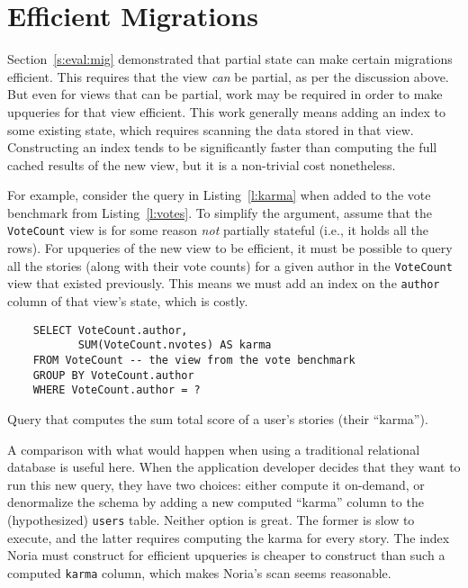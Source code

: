 \section{Efficient Migrations}

Section~\ref{s:eval:mig} demonstrated that partial state can make certain
migrations efficient. This requires that the view \emph{can} be partial, as
per the discussion above. But even for views that can be partial, work may be
required in order to make upqueries for that view efficient. This work generally
means adding an index to some existing state, which requires scanning the data
stored in that view. Constructing an index tends to be significantly faster than
computing the full cached results of the new view, but it is a non-trivial cost
nonetheless.

For example, consider the query in Listing~\vref{l:karma} when added to the vote
benchmark from Listing~\vref{l:votes}. To simplify the argument, assume that the
\texttt{VoteCount} view is for some reason \emph{not} partially stateful (i.e.,
it holds all the rows). For upqueries of the new view to be efficient, it must
be possible to query all the stories (along with their vote counts) for a given
author in the \texttt{VoteCount} view that existed previously. This means we
must add an index on the \texttt{author} column of that view's state, which is
costly.

\begin{listing}[h]
  \begin{verbatim}
    SELECT VoteCount.author,
           SUM(VoteCount.nvotes) AS karma
    FROM VoteCount -- the view from the vote benchmark
    GROUP BY VoteCount.author
    WHERE VoteCount.author = ?
  \end{verbatim}
  \caption{Query that computes the sum total score of a user's stories
  (their ``karma'').}
  \label{l:karma}
\end{listing}

A comparison with what would happen when using a traditional relational database
is useful here. When the application developer decides that they want to run
this new query, they have two choices: either compute it on-demand, or
denormalize the schema by adding a new computed ``karma'' column to the
(hypothesized) \texttt{users} table. Neither option is great. The former is slow
to execute, and the latter requires computing the karma for every story. The
index Noria must construct for efficient upqueries is cheaper to construct than
such a computed \texttt{karma} column, which makes Noria's scan seems
reasonable.

